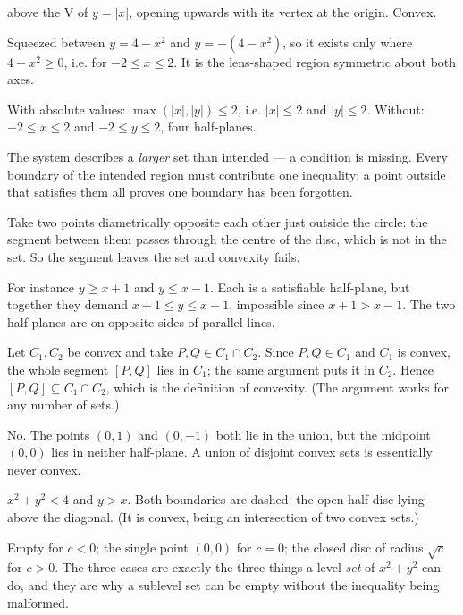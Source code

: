 \begin{solutions}
        above the V of $y=|x|$, opening upwards with its vertex at the
        origin. Convex.
  \item Squeezed between $y=4-x^{2}$ and $y=-(4-x^{2})$, so it exists only
        where $4-x^{2}\ge0$, i.e. for $-2\le x\le2$. It is the
        lens-shaped region symmetric about both axes.
  \item With absolute values: $\max(|x|,|y|)\le2$, i.e. $|x|\le2$ and
        $|y|\le2$. Without: $-2\le x\le2$ and $-2\le y\le2$, four
        half-planes.
  \item The system describes a \emph{larger} set than intended --- a
        condition is missing. Every boundary of the intended region must
        contribute one inequality; a point outside that satisfies them all
        proves one boundary has been forgotten.
  \item Take two points diametrically opposite each other just outside the
        circle: the segment between them passes through the centre of the
        disc, which is not in the set. So the segment leaves the set and
        convexity fails.
  \item For instance $y\ge x+1$ and $y\le x-1$. Each is a satisfiable
        half-plane, but together they demand $x+1\le y\le x-1$, impossible
        since $x+1>x-1$. The two half-planes are on opposite sides of
        parallel lines.
  \item Let $C_{1},C_{2}$ be convex and take $P,Q\in C_{1}\cap C_{2}$.
        Since $P,Q\in C_{1}$ and $C_{1}$ is convex, the whole segment
        $[P,Q]$ lies in $C_{1}$; the same argument puts it in $C_{2}$.
        Hence $[P,Q]\subseteq C_{1}\cap C_{2}$, which is the definition of
        convexity. (The argument works for any number of sets.)
  \item No. The points $(0,1)$ and $(0,-1)$ both lie in the union, but the
        midpoint $(0,0)$ lies in neither half-plane. A union of disjoint
        convex sets is essentially never convex.
  \item $x^{2}+y^{2}<4$ \;and\; $y>x$. Both boundaries are dashed: the open
        half-disc lying above the diagonal. (It is convex, being an
        intersection of two convex sets.)
  \item Empty for $c<0$; the single point $(0,0)$ for $c=0$; the closed disc
        of radius $\sqrt{c}$ for $c>0$. The three cases are exactly the
        three things a level \emph{set} of $x^{2}+y^{2}$ can do, and they
        are why a sublevel set can be empty without the inequality being
        malformed.

\end{solutions}
